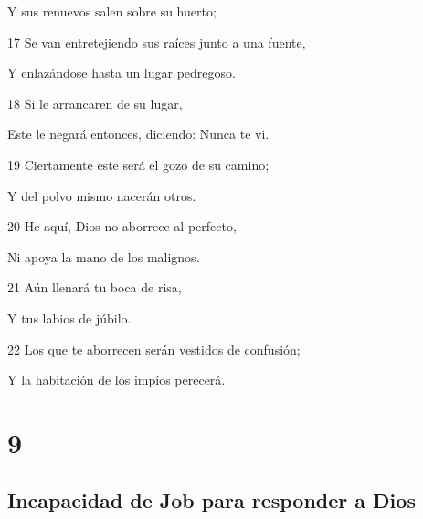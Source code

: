 \par Y sus renuevos salen sobre su huerto;
\par 17 Se van entretejiendo sus raíces junto a una fuente,
\par Y enlazándose hasta un lugar pedregoso.
\par 18 Si le arrancaren de su lugar,
\par Este le negará entonces, diciendo: Nunca te vi.
\par 19 Ciertamente este será el gozo de su camino;
\par Y del polvo mismo nacerán otros.
\par 20 He aquí, Dios no aborrece al perfecto,
\par Ni apoya la mano de los malignos.
\par 21 Aún llenará tu boca de risa,
\par Y tus labios de júbilo.
\par 22 Los que te aborrecen serán vestidos de confusión;
\par Y la habitación de los impíos perecerá.

\chapter{9}

\section*{Incapacidad de Job para responder a Dios}

